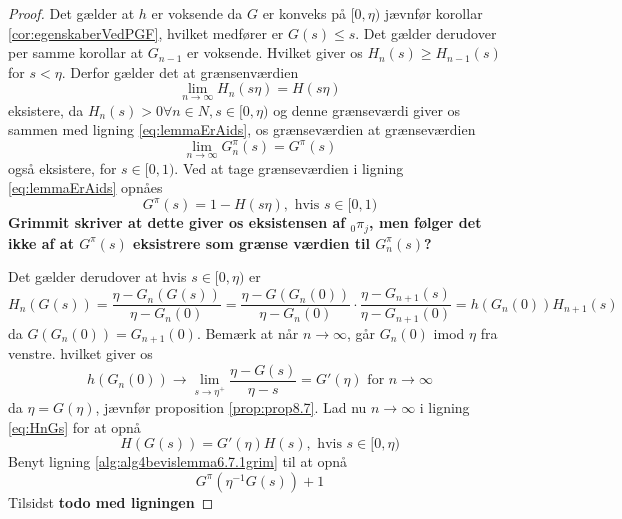 \begin{proof}
Det gælder at $h$ er voksende da $G$ er konveks på $[0, \eta)$ jævnfør korollar \ref{cor:egenskaberVedPGF}, hvilket medfører er $G(s) \leq s$. Det gælder derudover per samme korollar at $G_{n - 1}$ er voksende. Hvilket giver os $H_n(s) \geq H_{n - 1}(s)$ for $s < \eta$. Derfor gælder det at grænsenværdien 
\begin{equation*}
    \lim_{n \to \infty} H_n(s\eta) = H(s\eta)
\end{equation*}
eksistere, da $H_n(s) > 0 \forall n \in N, s \in [0, \eta)$ og denne grænseværdi giver os sammen med ligning \ref{eq:lemmaErAids}, os grænseværdien at grænseværdien
\begin{equation*}
    \lim_{n \to \infty} G_n^\pi(s) = G^\pi(s)
\end{equation*}
også eksistere, for $s \in [0, 1)$. Ved at tage grænseværdien i ligning \eqref{eq:lemmaErAids} opnåes
\begin{equation}\label{alg:alg4bevislemma6.7.1grim}
   G^\pi(s) = 1 - H(s \eta), \text{ hvis } s \in [0, 1) 
\end{equation}
\textbf{Grimmit skriver at dette giver os eksistensen af ${}_0\pi_j$, men følger det ikke af at $G^\pi(s)$ eksistrere som grænse værdien til $G^\pi_n(s)$?} 

Det gælder derudover at hvis $s \in [0, \eta)$ er 
\begin{equation*}\label{eq:HnGs}
    H_n(G(s)) = \frac{\eta - G_n(G(s))}{\eta - G_n(0)} = \frac{\eta - G(G_n(0))}{\eta - G_n(0)} \cdot \frac{\eta - G_{n + 1}(s)}{\eta - G_{n + 1}(0)} = h(G_n(0))H_{n + 1}(s)
\end{equation*}
da $G(G_n(0)) = G_{n + 1}(0)$.
Bemærk at når $n \to \infty$, går $G_n(0)$ imod $\eta$ fra venstre. hvilket giver os
\begin{equation*}
    h(G_n(0)) \to \lim_{s \to \eta^+} \frac{\eta - G(s)}{\eta - s} = G'(\eta) \text{ for } n \to \infty
\end{equation*}
da $\eta = G(\eta)$, jævnfør proposition \ref{prop:prop8.7}. Lad nu $n \to \infty$ i ligning \eqref{eq:HnGs} for at opnå
\begin{equation} \label{alg:alg6bevislemma6.7.1grim}
    H(G(s)) = G'(\eta)H(s), \text { hvis } s \in [0, \eta)
\end{equation}
Benyt ligning \ref{alg:alg4bevislemma6.7.1grim} til at opnå
\begin{equation*}
    G^\pi(\eta^{-1}G(s)) + 1
\end{equation*}
Tilsidst \textbf{todo med ligningen}
\end{proof}

